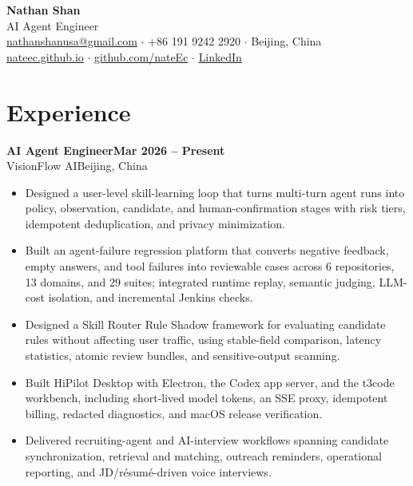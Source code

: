 \documentclass[10pt,letterpaper]{article}
\newcommand{\role}[4]{%
  \textbf{#1}\hfill\textbf{#2}\\[-1pt]
  \textcolor{muted}{#3}\hfill\textcolor{muted}{#4}\par
}
\begin{document}
\fontsize{9.2}{10.8}\selectfont

\begin{center}
  {\fontsize{21}{23}\selectfont\bfseries Nathan Shan}\\[1pt]
  {\large\color{accent}AI Agent Engineer}\\[3pt]
  \href{mailto:nathanshanusa@gmail.com}{nathanshanusa@gmail.com}
  \quad $\cdot$ \quad +86 191 9242 2920
  \quad $\cdot$ \quad Beijing, China\\[2pt]
  \href{https://nateec.github.io/}{nateec.github.io}
  \quad $\cdot$ \quad
  \href{https://github.com/nateEc}{github.com/nateEc}
  \quad $\cdot$ \quad
  \href{https://www.linkedin.com/in/yukun-shan-803a02225/}{LinkedIn}
\end{center}

\section{Experience}

\role{AI Agent Engineer}{Mar 2026 -- Present}{VisionFlow AI}{Beijing, China}
\begin{itemize}
  \item Designed a user-level skill-learning loop that turns multi-turn agent runs into policy, observation, candidate, and human-confirmation stages with risk tiers, idempotent deduplication, and privacy minimization.
  \item Built an agent-failure regression platform that converts negative feedback, empty answers, and tool failures into reviewable cases across 6 repositories, 13 domains, and 29 suites; integrated runtime replay, semantic judging, LLM-cost isolation, and incremental Jenkins checks.
  \item Designed a Skill Router Rule Shadow framework for evaluating candidate rules without affecting user traffic, using stable-field comparison, latency statistics, atomic review bundles, and sensitive-output scanning.
  \item Built HiPilot Desktop with Electron, the Codex app server, and the t3code workbench, including short-lived model tokens, an SSE proxy, idempotent billing, redacted diagnostics, and macOS release verification.
  \item Delivered recruiting-agent and AI-interview workflows spanning candidate synchronization, retrieval and matching, outreach reminders, operational reporting, and JD/r\'esum\'e-driven voice interviews.
\end{itemize}
\end{document}
